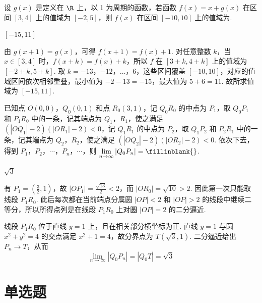 \begin{problem}
设 \(g(x)\) 是定义在 \(\R\) 上，以 1 为周期的函数，若函数 \(f(x) = x + g(x)\) 在区间 \([3,4]\) 上的值域为 \([-2,5]\)，则 \(f(x)\) 在区间 \([-10,10]\) 上的值域为\fillinblank{}.
\end{problem}

\begin{answer}
\([-15,11]\)
\end{answer}

\begin{solution}
由 \(g(x+1)=g(x)\)，可得 \(f(x+1)=f(x)+1\). 对任意整数 \(k\)，当 \(x\in[3,4]\) 时，\(f(x+k)=f(x)+k\)，所以 \(f\) 在 \([3+k,4+k]\) 上的值域为 \([-2+k,5+k]\). 取 \(k=-13\)，\(-12\)，\(\ldots\)，\(6\)，这些区间覆盖 \([-10,10]\)，对应的值域区间依次相邻重叠，最小值为 \(-2-13=-15\)，最大值为 \(5+6=11\). 故所求值域为 \([-15,11]\).
\end{solution}

\begin{problem}
已知点 \(O(0,0)\)，\(Q_0(0,1)\) 和点 \(R_0(3,1)\)，记 \(Q_0R_0\) 的中点为 \(P_1\)，取 \(Q_0P_1\) 和 \(P_1R_0\) 中的一条，记其端点为 \(Q_1\)，\(R_1\)，使之满足 \((|OQ_1| - 2)(|OR_1| - 2) < 0\)，记 \(Q_1R_1\) 的中点为 \(P_2\)，取 \(Q_1P_2\) 和 \(P_2R_1\) 中的一条，记其端点为 \(Q_2\)，\(R_2\)，使之满足 \((|OQ_2| - 2)(|OR_2| - 2) < 0\). 依次下去，得到 \(P_1\)，\(P_2\)，\(\cdots\)，\(P_n\)，\(\cdots\)，则 \(\lim\limits_{n \to \infty} \left|Q_0P_n\right| =\fillinblank{} \).
\end{problem}

\begin{answer}
\(\sqrt{3}\)
\end{answer}

\begin{solution}
有 \(P_1=(\frac32,1)\)，故 \(|OP_1|=\frac{\sqrt{13}}{2}<2\)，而 \(|OR_0|=\sqrt{10}>2\). 因此第一次只能取线段 \(P_1R_0\). 此后每次都在当前端点分属圆 \(|OP|<2\) 和 \(|OP|>2\) 的线段中继续二等分，所以所得点列是在线段 \(P_1R_0\) 上对圆 \(|OP|=2\) 的二分逼近.

线段 \(P_1R_0\) 位于直线 \(y=1\) 上，且在相关部分横坐标为正. 直线 \(y=1\) 与圆 \(x^2+y^2=4\) 的交点满足 \(x^2+1=4\)，故分界点为 \(T(\sqrt3,1)\). 二分逼近给出 \(P_n\to T\)，从而
\[
\lim_{n\to\infty}|Q_0P_n|=|Q_0T|=\sqrt3
\]
\end{solution}

\section{单选题}

